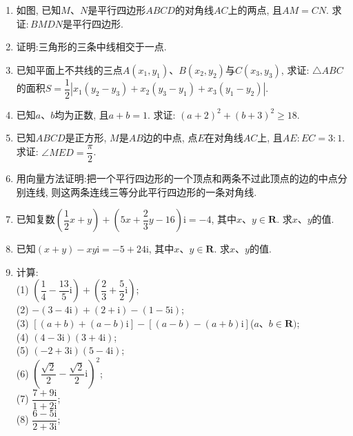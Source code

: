 \documentclass[10pt,a4paper]{article}
\begin{document}
\begin{enumerate}[1.]
\item 如图, 已知$M$、$N$是平行四边形$ABCD$的对角线$AC$上的两点, 且$AM=CN$. 求证$: BMDN$是平行四边形.
\begin{center}
\end{center}
\item 证明:三角形的三条中线相交于一点.
\item 已知平面上不共线的三点$A(x_1, y_1)$、$B(x_2, y_2)$与$C(x_3, y_3)$, 求证: $\triangle ABC$的面积$S=\dfrac 12|x_1(y_2-y_3)+x_2(y_3-y_1)+x_3(y_1-y_2)|$.
\item 已知$a$、$b$均为正数, 且$a+b=1$. 求证: $(a+2)^2+(b+3)^2\ge 18$.
\item 已知$ABCD$是正方形, $M$是$AB$边的中点, 点$E$在对角线$AC$上, 且$AE: EC=3: 1$. 求证: $\angle MED=\dfrac \pi 2$.
\item 用向量方法证明:把一个平行四边形的一个顶点和两条不过此顶点的边的中点分别连线, 则这两条连线三等分此平行四边形的一条对角线.
\item 已知复数$(\dfrac 12x+y)+(5x+\dfrac 23y-16)\mathrm{i}=-4$, 其中$x$、$y\in \mathbf{R}$. 求$x$、$y$的值.
\item 已知$(x+y)-xy\mathrm{i}=-5+24\mathrm{i}$, 其中$x$、$y\in \mathbf{R}$. 求$x$、$y$的值.
\item 计算:\\
(1) $(\dfrac 14-\dfrac{13}5\mathrm{i})+(\dfrac 23+\dfrac 52\mathrm{i})$;\\
(2) $-(3-4\mathrm{i})+(2+\mathrm{i})-(1-5\mathrm{i})$;\\
(3) $[(a+b)+(a-b)\mathrm{i}]-[(a-b)-(a+b)\mathrm{i}]$($a$、$b\in \mathbf{R})$;\\
(4) $(4-3\mathrm{i})(3+4\mathrm{i})$;\\
(5) $(-2+3\mathrm{i})(5-4\mathrm{i})$;\\
(6) $(\dfrac{\sqrt 2}2-\dfrac{\sqrt 2}2\mathrm{i})^2$;\\
(7) $\dfrac{7+9\mathrm{i}}{1+2\mathrm{i}}$;\\
(8) $\dfrac{6-5\mathrm{i}}{2+3\mathrm{i}}$;\\

\end{enumerate}
\end{document}
